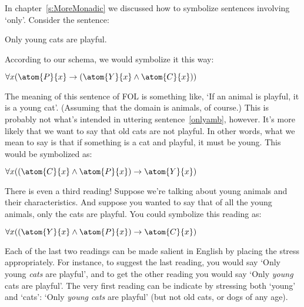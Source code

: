 In chapter~\ref{s:MoreMonadic} we discussed how to symbolize sentences involving `only'. Consider the sentence:
\begin{earg}
	\item[\ex{onlyamb}] Only young cats are playful.
\end{earg} 
According to our schema, we would symbolize it this way:
\begin{earg}
	\item[] $\forall x(\atom{P}{x} \eif (\atom{Y}{x} \eand \atom{C}{x}))$ 
\end{earg}
The meaning of this sentence of FOL is something like, `If an animal is playful, it is a young cat'. (Assuming that the domain is animals, of course.) This is probably not what's intended in uttering sentence~\ref{onlyamb}, however. It's more likely that we want to say that old cats are not playful. In other words, what we mean to say is that if something is a cat and playful, it must be young. This would be symbolized as:
\begin{earg}
	\item[] $\forall x((\atom{C}{x} \eand \atom{P}{x}) \eif \atom{Y}{x})$ 
\end{earg}
There is even a third reading! Suppose we're talking about young animals and their characteristics. And suppose you wanted to say that of all the young animals, only the cats are playful. You could symbolize this reading as:
\begin{earg}
	\item[] $\forall x((\atom{Y}{x} \eand \atom{P}{x}) \eif \atom{C}{x})$ 
\end{earg}
Each of the last two readings can be made salient in English by placing the stress appropriately. For instance, to suggest the last reading, you would say `Only young \emph{cats} are playful', and to get the other reading you would say `Only \emph{young} cats are playful'.  The very first reading can be indicate by stressing both `young' and `cats': `Only \emph{young cats} are playful' (but not old cats, or dogs of any age).

